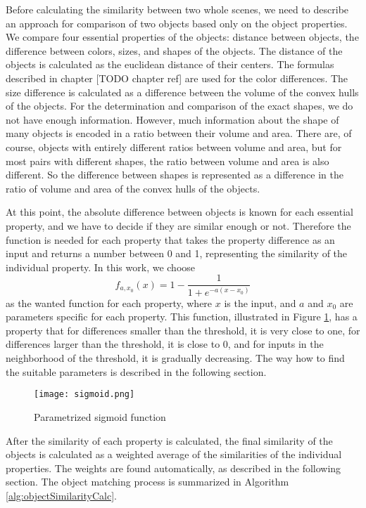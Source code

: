 Before calculating the similarity between two whole scenes, we need to describe an approach for comparison of two objects based only on the object properties. We compare four essential properties of the objects: distance between objects, the difference between colors, sizes, and shapes of the objects. The distance of the objects is calculated as the euclidean distance of their centers. The formulas described in chapter [TODO chapter ref] are used for the color differences. The size difference is calculated as a difference between the volume of the convex hulls of the objects. For the determination and comparison of the exact shapes, we do not have enough information. However, much information about the shape of many objects is encoded in a ratio between their volume and area. There are, of course, objects with entirely different ratios between volume and area, but for most pairs with different shapes, the ratio between volume and area is also different. So the difference between shapes is represented as a difference in the ratio of volume and area of the convex hulls of the objects.\par
At this point, the absolute difference between objects is known for each essential property, and we have to decide if they are similar enough or not. Therefore the function is needed for each property that takes the property difference as an input and returns a number between 0 and 1, representing the similarity of the individual property. In this work, we choose
$$
    f_{a,x_0}(x) = 1 - \frac{1}{1 + e^{-a(x-x_0)}}
$$
as the wanted function for each property, where $x$ is the input, and $a$ and $x_0$ are parameters specific for each property. This function, illustrated in Figure \ref{fig:sigmoid}, has a property that for differences smaller than the threshold, it is very close to one, for differences larger than the threshold, it is close to 0, and for inputs in the neighborhood of the threshold, it is gradually decreasing. The way how to find the suitable parameters is described in the following section.\par

\begin{figure}[htpb]
    \centering
    \texttt{[image: sigmoid.png]}
    \caption{Parametrized sigmoid function} \label{fig:sigmoid}
\end{figure}

After the similarity of each property is calculated, the final similarity of the objects is calculated as a weighted average of the similarities of the individual properties. The weights are found automatically, as described in the following section. The object matching process is summarized in Algorithm \ref{alg:objectSimilarityCalc}.

